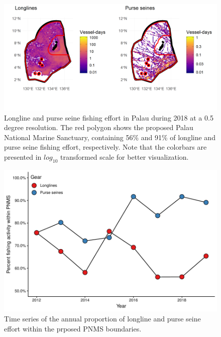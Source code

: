 \documentclass[12pt]{article}
\begin{document}
\begin{figure}
\centering
\includegraphics{img/plw_2018.png}
\caption{\label{fig:plw_2018}Longline and purse seine fishing effort in Palau during 2018 at a 0.5 degree resolution. The red polygon shows the proposed Palau National Marine Sanctuary, containing 56\% and 91\% of longline and purse seine fishing effort, respectively. Note that the colorbars are presented in $log_{10}$ transformed scale for better visualization.}
\end{figure}

\begin{figure}
\centering
\includegraphics{img/plw_ts_plot.pdf}
\caption{\label{fig:plw_ts_plot}Time series of the annual proportion of longline and purse seine effort within the prposed PNMS boundaries.}
\end{figure}
\end{document}
